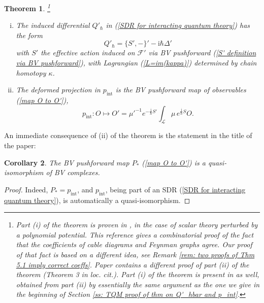 \documentclass{amsart}
\theoremstyle{plain} %
\newtheorem{thm}{Theorem}[section]
\newtheorem{cor}[thm]{Corollary}
\theoremstyle{definition}
\theoremstyle{remark}
\newcommand{\bl}{\color{blue}}
\newcommand{\F}{\mathcal{F}}
\newcommand{\LL}{\mathcal{L}}
\newcommand{\ii}{\mathrm{int}}
\newcommand{\iii}{\mathrm{i}}
\begin{document}
\begin{thm}\label{thm: Q' and p_int via BV pushforward}
\!\!\!\footnote{Part (i) of the theorem is proven in \cite{SS}, in the case of scalar theory perturbed by a polynomial potential. This reference gives a combinatorial proof of the fact that the coefficients of cable diagrams and Feynman graphs agree. Our proof of that fact is based on a different idea, see Remark \ref{rem: two proofs of Thm 5.1 imply correct coeffs}.
Paper \cite{DJP} contains a different proof of part (ii) of the theorem (Theorem 3 in loc. cit.). 
Part (i) of the theorem is present in \cite{DJP} as well, obtained from part (ii) by essentially the same argument as the one we give in the beginning of Section \ref{ss: TQM proof of thm on Q'_hbar and p_int}.
        } 
    \begin{enumerate}[(i)]
        \item
        The induced differential $Q'_\hbar$ in (\ref{SDR for interacting quantum theory}) has the form
        \begin{equation}\label{Q'_hbar=(S',-)+Delta'}
            Q'_\hbar=\{S',-\}'-\iii\hbar\Delta'
        \end{equation}
        with $S'$ the effective action induced on $\F'$ via %
        BV pushforward (\ref{S' definition via BV pushforward}), with Lagrangian (\ref{L=im(kappa)}) determined by chain homotopy $\kappa$.
        \item The deformed projection in $p_\ii$ is the %
        BV pushforward map of observables (\ref{map O to O'}),
        \begin{equation}\label{p_int}
            p_\ii\colon O\mapsto O'=\mu'^{-1}e^{-\frac{\iii}{\hbar}S'}\int_\LL \mu\, e^{\frac{\iii}{\hbar}S}O.
        \end{equation}
    \end{enumerate}
\end{thm}

An immediate consequence of (ii) of the theorem is the statement in the title of the paper:
\begin{cor}\label{cor: P_* is q-iso}
    The BV pushforward map $P_*$ (\ref{map O to O'}) is a quasi-isomorphism of BV complexes.
\end{cor}
\begin{proof}
Indeed, $P_*=p_\ii$, and $p_\ii$, being part of an SDR (\ref{SDR for interacting quantum theory}), is automatically a quasi-isomorphism.
\end{proof}
\end{document}
